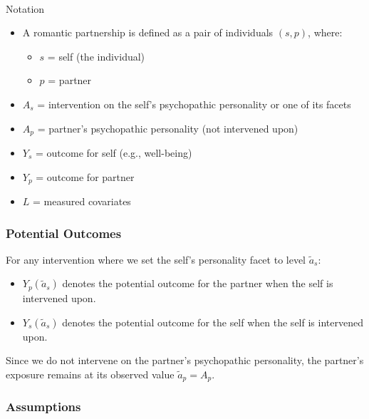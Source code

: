 \documentclass[
  singlecolumn]{article}
\makeatletter
\let\oldparagraph\paragraph
\renewcommand{\paragraph}{
    \@ifstar
      \xxxParagraphStar
      \xxxParagraphNoStar
  }
\newcommand{\xxxParagraphStar}[1]{\oldparagraph*{#1}\mbox{}}
\newcommand{\xxxParagraphNoStar}[1]{\oldparagraph{#1}\mbox{}}
\providecommand{\tightlist}{%
  \setlength{\itemsep}{0pt}\setlength{\parskip}{0pt}}\usepackage{longtable,booktabs,array}
\makeatother
\begin{document}
\paragraph{Notation}\label{notation}

\begin{itemize}
\tightlist
\item
  A romantic partnership is defined as a pair of individuals \((s, p)\),
  where:

  \begin{itemize}
  \tightlist
  \item
    \(s\) = self (the individual)
  \item
    \(p\) = partner
  \end{itemize}
\item
  \(A_s\) = intervention on the self's psychopathic personality or one
  of its facets
\item
  \(A_p\) = partner's psychopathic personality (not intervened upon)
\item
  \(Y_s\) = outcome for self (e.g., well-being)
\item
  \(Y_p\) = outcome for partner
\item
  \(L\) = measured covariates
\end{itemize}

\subsubsection{Potential Outcomes}\label{potential-outcomes}

For any intervention where we set the self's personality facet to level
\(\tilde{a}_s\):

\begin{itemize}
\tightlist
\item
  \(Y_p(\tilde{a}_s)\) denotes the potential outcome for the partner
  when the self is intervened upon.
\item
  \(Y_s(\tilde{a}_s)\) denotes the potential outcome for the self when
  the self is intervened upon.
\end{itemize}

Since we do not intervene on the partner's psychopathic personality, the
partner's exposure remains at its observed value \(\tilde{a}_p = A_p\).

\subsubsection{Assumptions}\label{assumptions}
\end{document}
